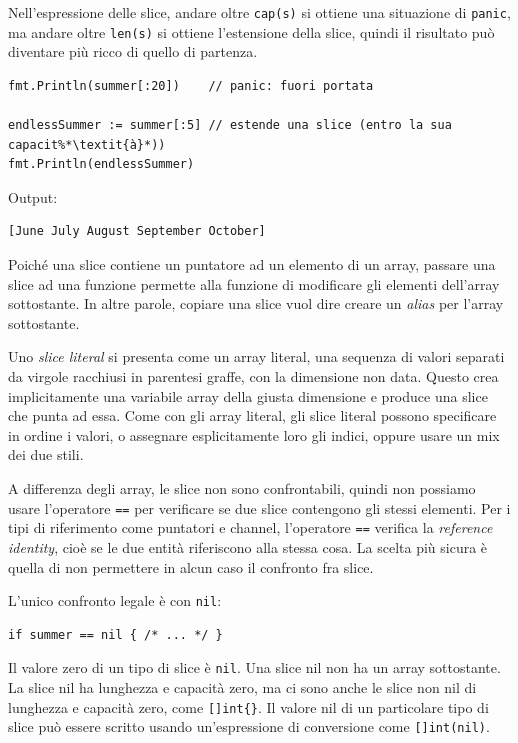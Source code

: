 \documentclass[../../thesis.tex]{subfiles}
\begin{document}
    Nell'espressione delle slice, andare oltre \verb"cap(s)" si ottiene una situazione di \verb"panic", ma andare oltre \verb"len(s)" si ottiene l'estensione della slice, quindi il risultato può diventare più ricco di quello di partenza.
    \begin{lstlisting}[frame = single,label={lst:lstlisting3-2.4}]
fmt.Println(summer[:20])    // panic: fuori portata

endlessSummer := summer[:5] // estende una slice (entro la sua capacit%*\textit{à}*))
fmt.Println(endlessSummer)
    \end{lstlisting}
    Output:
    \begin{lstlisting}[language = bash, frame = L,label={lst:lstlisting3-2.5}]
[June July August September October]
    \end{lstlisting}
    Poiché una slice contiene un puntatore ad un elemento di un array, passare una slice ad una funzione permette alla funzione di modificare gli elementi dell'array sottostante.
    In altre parole, copiare una slice vuol dire creare un \textit{alias} per l'array sottostante.
    \hfill \vspace{12pt}

    Uno \textit{slice literal} si presenta come un array literal, una sequenza di valori separati da virgole racchiusi in parentesi graffe, con la dimensione non data.
    Questo crea implicitamente una variabile array della giusta dimensione e produce una slice che punta ad essa.
    Come con gli array literal, gli slice literal possono specificare in ordine i valori, o assegnare esplicitamente loro gli indici, oppure usare un mix dei due stili.
    \hfill \vspace{12pt}

    A differenza degli array, le slice non sono confrontabili, quindi non possiamo usare l'operatore \verb"==" per verificare se due slice contengono gli stessi elementi.
    Per i tipi di riferimento come puntatori e channel, l'operatore \verb"==" verifica la \textit{reference identity}, cioè se le due entità riferiscono alla stessa cosa.
    La scelta più sicura è quella di non permettere in alcun caso il confronto fra slice.
    \hfill \vspace{12pt}

    L'unico confronto legale è con \verb"nil":
    \begin{lstlisting}[frame = single,label={lst:lstlisting3-2.6}]
if summer == nil { /* ... */ }
    \end{lstlisting}
    Il valore zero di un tipo di slice è \verb"nil".
    Una slice nil non ha un array sottostante.
    La slice nil ha lunghezza e capacità zero, ma ci sono anche le slice non nil di lunghezza e capacità zero, come \verb"[]int{}".
    Il valore nil di un particolare tipo di slice può essere scritto usando un'espressione di conversione come \verb"[]int(nil)".
    \hfill \vspace{12pt}
\end{document}
